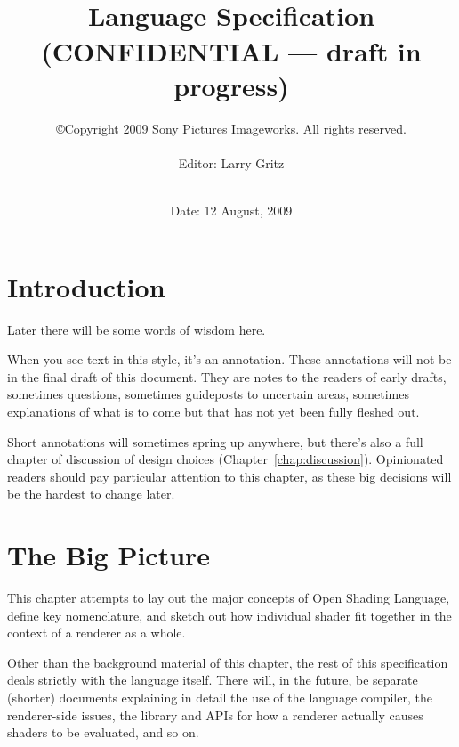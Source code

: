 \documentclass[11pt,letterpaper]{book}
\title{ 
{\Huge{\bf \product}
{\bf\sffamily \versionnumber} \medskip \\ \huge 
Language Specification
\\ \large (CONFIDENTIAL --- draft in progress) 
} \bigskip }
\author{
\copyright Copyright 2009 Sony Pictures Imageworks. All rights reserved.
 \bigskip \\
\vspace{1in} \\
Editor: Larry Gritz \\
 \bigskip \\
}
\date{{\large Date: 12 August, 2009}}
\def\langname{Open Shading Language\xspace}
\begin{document}
\frontmatter

\maketitle

%

\vspace*{2in}




\setcounter{tocdepth}{1}
\tableofcontents

\mainmatter


%


\chapter{Introduction}
\label{chap:intro}

Later there will be some words of wisdom here.

\bigskip

\begin{annotate}
When you see text in this style, it's an annotation.  These annotations
will not be in the final draft of this document.  They are notes to the
readers of early drafts, sometimes questions, sometimes guideposts
to uncertain areas, sometimes explanations of what is to come but that
has not yet been fully fleshed out.

Short annotations will sometimes spring up anywhere, but there's also a
full chapter of discussion of design choices
(Chapter~\ref{chap:discussion}).  Opinionated readers should pay
particular attention to this chapter, as these big decisions will be the
hardest to change later.

\end{annotate}


\chapter{The Big Picture}
\label{chap:shaderstructure}
\label{chap:bigpicture}

This chapter attempts to lay out the major concepts of \langname,
define key nomenclature, and sketch out how individual shader fit 
together in the context of a renderer as a whole.

\begin{annotate}
Other than the background material of this chapter, the rest of this
specification deals strictly with the language itself.  There will, in
the future, be separate (shorter) documents explaining in detail the use
of the language compiler, the renderer-side issues, the library and APIs
for how a renderer actually causes shaders to be evaluated, and so on.
\end{annotate}
\end{document}
